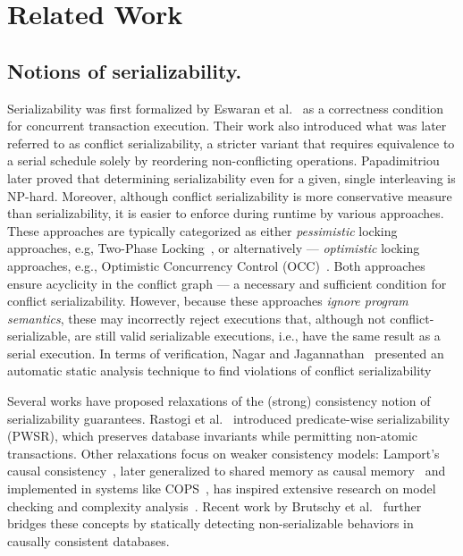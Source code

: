 \section{Related Work}
\label{sec:relatedWork}

\subsection{Notions of serializability.}
\label{sec:related:notions-of-serializability}


Serializability was first formalized by Eswaran et al.~\cite{EsGrKoTr76} as a correctness condition for concurrent transaction execution. Their work also introduced what was later referred to as conflict serializability, a stricter variant that requires equivalence to a serial schedule solely by reordering non-conflicting operations. Papadimitriou~\cite{Pa79, Pa86} later proved that determining serializability even for a given, single interleaving is NP-hard. 
%
Moreover, although conflict serializability is more conservative measure than serializability, it is easier to enforce during runtime by various approaches. 
%
These approaches are typically categorized as either \textit{pessimistic} locking approaches, e.g, Two-Phase Locking~\cite{BeHaGo87}, or alternatively --- \textit{optimistic} locking approaches, e.g., Optimistic Concurrency Control (OCC)~\cite{KuRo81, BuMo06}.
%
Both approaches ensure acyclicity in the conflict graph --- a necessary and sufficient condition for conflict serializability. However, because these approaches \textit{ignore program semantics}, these may incorrectly reject executions that, although not conflict-serializable, are still valid serializable executions, i.e., have the same result as a serial execution. In terms of verification, Nagar and Jagannathan~\cite{KaJa18} presented an automatic static analysis technique to find violations of conflict serializability
%

Several works have proposed relaxations of the (strong) consistency notion of serializability guarantees. Rastogi et al.~\cite{RaMeBrKoSi93} introduced predicate-wise serializability (PWSR), which preserves database invariants while permitting non-atomic transactions. 
%
Other relaxations focus on weaker consistency models: Lamport’s causal consistency~\cite{La78}, later generalized to shared memory as causal memory~\cite{AhNeBuKoHu95} and implemented in systems like COPS~\cite{LlFrKaAn11}, has inspired extensive research on model checking and complexity analysis~\cite{BoEnGuHa17,ZeBiBoEnEr19,LaBo20}. 
%
Recent work by Brutschy et al.~\cite{BrDiMuVe18} further bridges these concepts by statically detecting non-serializable behaviors in causally consistent databases.


